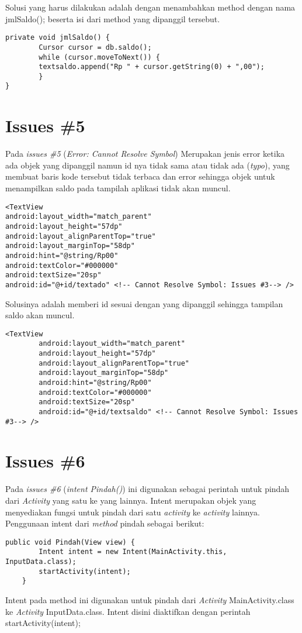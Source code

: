 Solusi yang harus dilakukan adalah dengan menambahkan method dengan nama jmlSaldo(); beserta isi dari method yang dipanggil tersebut.
\begin{verbatim}
private void jmlSaldo() {
        Cursor cursor = db.saldo();
        while (cursor.moveToNext()) {
        textsaldo.append("Rp " + cursor.getString(0) + ",00");
        }
}
\end{verbatim}

\section{Issues \#5}
Pada \textit{issues \#5} (\textit{Error: Cannot Resolve Symbol}) Merupakan jenis error ketika ada objek yang dipanggil namun id nya tidak sama atau tidak ada (\textit{typo}), yang membuat baris kode tersebut tidak terbaca dan error sehingga objek untuk menampilkan saldo pada tampilah aplikasi tidak akan muncul.
\begin{verbatim}
<TextView
android:layout_width="match_parent"
android:layout_height="57dp"
android:layout_alignParentTop="true"
android:layout_marginTop="58dp"
android:hint="@string/Rp00"
android:textColor="#000000"
android:textSize="20sp" 
android:id="@+id/textado" <!-- Cannot Resolve Symbol: Issues #3--> />
\end{verbatim}

Solusinya adalah memberi id sesuai dengan yang dipanggil sehingga tampilan saldo akan muncul.
\begin{verbatim}
<TextView
        android:layout_width="match_parent"
        android:layout_height="57dp"
        android:layout_alignParentTop="true"
        android:layout_marginTop="58dp"
        android:hint="@string/Rp00"
        android:textColor="#000000"
        android:textSize="20sp" 
        android:id="@+id/textsaldo" <!-- Cannot Resolve Symbol: Issues #3--> />
\end{verbatim}

\section{Issues \#6}
Pada \textit{issues \#6} (\textit{intent Pindah()}) ini digunakan sebagai perintah untuk pindah dari \textit{Activity} yang satu ke yang lainnya. Intent merupakan objek yang menyediakan fungsi untuk pindah dari satu \textit{activity} ke \textit{activity} lainnya. Penggunaan intent dari \textit{method} pindah sebagai berikut:
\begin{verbatim}
public void Pindah(View view) {
        Intent intent = new Intent(MainActivity.this, InputData.class);
        startActivity(intent);
    }
\end{verbatim}
Intent pada method ini digunakan untuk pindah dari \textit{Activity} MainActivity.class ke \textit{Activity} InputData.class. Intent disini diaktifkan dengan perintah startActivity(intent); 

